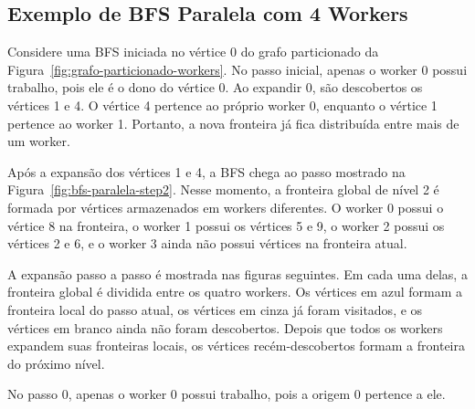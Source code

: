 \subsection{Exemplo de BFS Paralela com 4 Workers}
\label{sec:bfs-exemplo}
Considere uma BFS iniciada no vértice 0 do grafo particionado da
Figura~\ref{fig:grafo-particionado-workers}. No passo inicial, apenas o worker 0
possui trabalho, pois ele é o dono do vértice 0. Ao expandir 0, são descobertos
os vértices 1 e 4. O vértice 4 pertence ao próprio worker 0, enquanto o vértice 1
pertence ao worker 1. Portanto, a nova fronteira já fica distribuída entre mais
de um worker.

Após a expansão dos vértices 1 e 4, a BFS chega ao passo mostrado na
Figura~\ref{fig:bfs-paralela-step2}. Nesse momento, a fronteira global de
nível 2 é formada por vértices armazenados em workers diferentes. O worker 0
possui o vértice 8 na fronteira, o worker 1 possui os vértices 5 e 9, o worker 2
possui os vértices 2 e 6, e o worker 3 ainda não possui vértices na fronteira
atual.

A expansão passo a passo é mostrada nas figuras seguintes. Em cada uma delas, a
fronteira global é dividida entre os quatro workers. Os vértices em azul formam
a fronteira local do passo atual, os vértices em cinza já foram visitados, e os
vértices em branco ainda não foram descobertos. Depois que todos os workers
expandem suas fronteiras locais, os vértices recém-descobertos formam a
fronteira do próximo nível.

No passo 0, apenas o worker 0 possui trabalho, pois a origem 0 pertence a ele.


